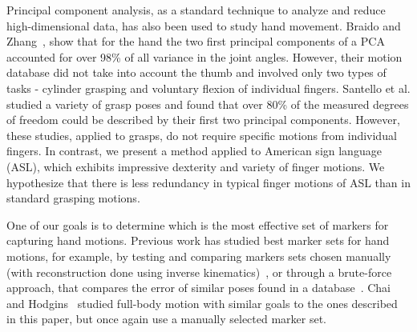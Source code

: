 Principal component analysis, as a standard technique to analyze and reduce high-dimensional data, has also been used to study hand movement. Braido and Zhang~, show that for the hand the two first principal components of a PCA accounted for over 98\% of all variance in the joint angles. However, their motion database did not take into account the thumb and involved only two types of tasks - cylinder grasping and voluntary flexion of individual fingers. Santello et al.  studied a variety of grasp poses and found that over 80\% of the measured degrees of freedom could be described by their first two principal components. 
However, these studies, applied to grasps, do not require specific motions from individual fingers. In contrast, we present a method applied to American sign language (ASL), which exhibits impressive dexterity and variety of finger motions. We hypothesize that there is less redundancy in typical finger motions of ASL than in standard grasping motions. 

One of our goals is to determine which is the most effective set of markers for capturing hand motions. Previous work has studied best marker sets for hand motions, for example,  by testing and comparing markers sets chosen manually (with reconstruction done using inverse kinematics)~\cite{HoyRyaOSu11}, or through a brute-force approach, that compares the error of similar poses found in a database~\cite{KanWheZor13}.  Chai and Hodgins~ studied full-body motion with similar goals to the ones described in this paper, but once again use a manually selected marker set.  




